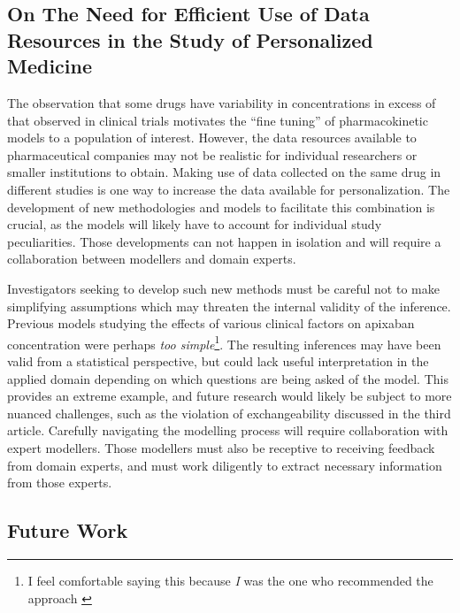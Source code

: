 \subsection{On The Need for Efficient Use of Data Resources in the Study of Personalized Medicine}

The observation that some drugs have variability in concentrations in excess of that observed in clinical trials motivates the ``fine tuning'' of pharmacokinetic models to a population of interest.  However, the data resources available to pharmaceutical companies may not be realistic for individual researchers or smaller institutions to obtain.  Making use of data collected on the same drug in different studies is one way to increase the data available for personalization.  The development of new methodologies and models to facilitate this combination is crucial, as the models will likely have to account for individual study peculiarities. Those developments can not happen in isolation and will require a collaboration between modellers and domain experts.

Investigators seeking to develop such new methods must be careful not to make simplifying assumptions which may threaten the internal validity of the inference. Previous models studying the effects of various clinical factors on apixaban concentration were perhaps \textit{too simple}\footnote{I feel comfortable saying this because \textit{I} was the one who recommended the approach \cite{gulilat_drug_2020}}.  The resulting inferences may have been valid from a statistical perspective, but could lack useful interpretation in the applied domain depending on which questions are being asked of the model.  This provides an extreme example, and future research would likely be subject to more nuanced challenges, such as the violation of exchangeability discussed in the third article. Carefully navigating the modelling process will require collaboration with expert modellers.  Those modellers must also be receptive to receiving feedback from domain experts, and must work diligently to extract necessary information from those experts.


\subsection{Future Work}

